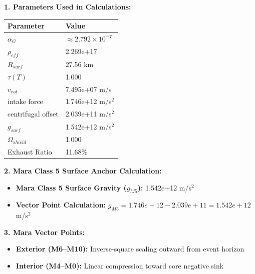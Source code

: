 \documentclass[11pt, a4paper]{article}
\begin{document}
\vspace{0.5em}
\noindent \textbf{1. Parameters Used in Calculations:}
\begin{center}
  \begin{tabular}{|l|l|}
    \hline
    \textbf{Parameter} & \textbf{Value} \\ \hline
    $\alpha_G$ & $\approx 2.792 \times 10^{-7}$ \\ \hline
    $\rho_{eff}$ & 2.269e+17 \\ \hline
    $R_{surf}$ & 27.56 km \\ \hline
    $\tau(T)$ & 1.000 \\ \hline
    $v_{rot}$ & 7.495e+07 m/s \\ \hline
    intake force & 1.746e+12 m/s$^2$ \\ \hline
    centrifugal offset & 2.039e+11 m/s$^2$ \\ \hline
    $g_{surf}$ & 1.542e+12 m/s$^2$ \\ \hline
    $\Omega_{shield}$ & 1.000 \\ \hline
    Exhaust Ratio & 11.68\% \\ \hline
  \end{tabular}
\end{center}

\vspace{0.5em}
\noindent \textbf{2. Mara Class 5 Surface Anchor Calculation:}
\begin{itemize}
  \item \textbf{Mara Class 5 Surface Gravity ($g_{M5}$):} 1.542e+12 m/s$^2$
  \item \textbf{Vector Point Calculation:} $g_{M5} = 1.746e+12 - 2.039e+11 = 1.542e+12$ m/s$^2$
\end{itemize}

\vspace{0.5em}
\noindent \textbf{3. Mara Vector Points:}
\begin{itemize}
  \item \textbf{Exterior (M6--M10):} Inverse-square scaling outward from event horizon
  \item \textbf{Interior (M4--M0):} Linear compression toward core negative sink
\end{itemize}
\end{document}
